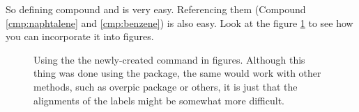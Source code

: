 %
So defining compound  and  is
    very easy.
%
Referencing them (Compound \ref{cmp:naphtalene} and \ref{cmp:benzene}) is also
    easy.
%
Look at the figure \ref{fig:compeg} to see how you can incorporate it
    into figures.

\begin{figure}[h]
    \centering
    
    \caption{
        Using the the newly-created  command in figures.
        Although this thing was done using the  package, the same
            would work with other methods, such as overpic package or others, it
            is just that the alignments of the labels might be somewhat more
            difficult.
        }
    \label{fig:compeg}
\end{figure}
